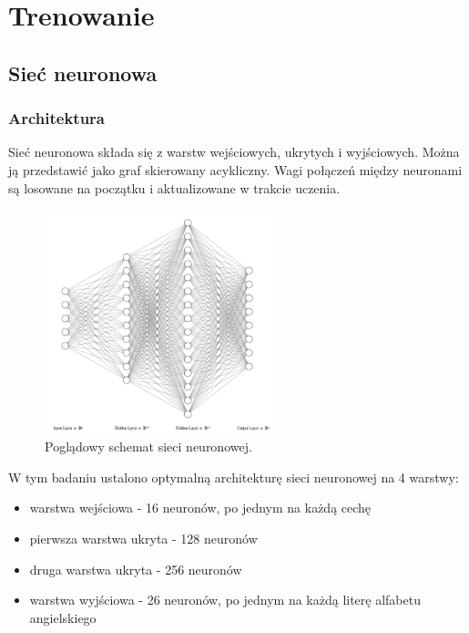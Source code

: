 \section{Trenowanie}\label{sec:trenowanie}
\subsection{Sieć neuronowa}\label{subsec:siec_neuronowa}
\subsubsection{Architektura}\label{subsubsec:architektura}
Sieć neuronowa składa się z warstw wejściowych, ukrytych i wyjściowych. Można ją przedstawić jako graf skierowany acykliczny.
Wagi połączeń między neuronami są losowane na początku i aktualizowane w trakcie uczenia.
\begin{figure}[H]
    \centering
    \includegraphics[width=0.6\textwidth]{img/nn.png}
    \caption{Poglądowy schemat sieci neuronowej.}
    \label{fig:neural_network}
\end{figure}
W tym badaniu ustalono optymalną architekturę sieci neuronowej na 4 warstwy:
\begin{itemize}
    \item warstwa wejściowa - 16 neuronów, po jednym na każdą cechę
    \item pierwsza warstwa ukryta - 128 neuronów
    \item druga warstwa ukryta - 256 neuronów
    \item warstwa wyjściowa - 26 neuronów, po jednym na każdą literę alfabetu angielskiego
\end{itemize}
